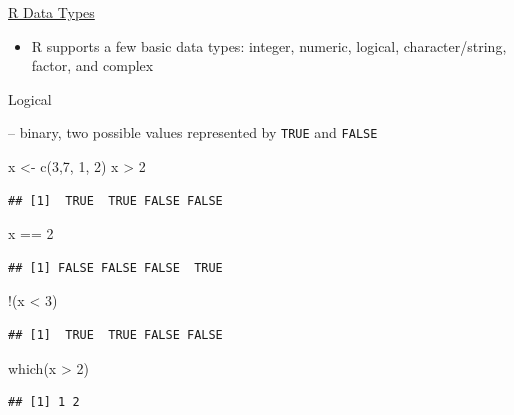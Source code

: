 \documentclass[
  10pt,
  ignorenonframetext,
]{beamer}
\newenvironment{Shaded}{\begin{snugshade}}{\end{snugshade}}
\newcommand{\DecValTok}[1]{\textcolor[rgb]{0.86,0.86,0.80}{#1}}
\newcommand{\KeywordTok}[1]{\textcolor[rgb]{0.94,0.87,0.69}{#1}}
\newcommand{\NormalTok}[1]{\textcolor[rgb]{0.80,0.80,0.80}{#1}}
\newcommand{\OperatorTok}[1]{\textcolor[rgb]{0.94,0.94,0.82}{#1}}
\newcommand{\StringTok}[1]{\textcolor[rgb]{0.80,0.58,0.58}{#1}}
\providecommand{\tightlist}{%
  \setlength{\itemsep}{0pt}\setlength{\parskip}{0pt}}
\begin{document}
\begin{frame}[fragile]{\href{https://www.stat.berkeley.edu/~nolan/stat133/Fall05/lectures/DataTypes4.pdf}{R
Data Types}}
\protect\hypertarget{r-data-types}{}

\begin{itemize}
\tightlist
\item
  R supports a few basic data types: integer, numeric, logical,
  character/string, factor, and complex
\end{itemize}

\begin{block}{Logical}

-- binary, two possible values represented by \texttt{TRUE} and
\texttt{FALSE}

\begin{Shaded}
\begin{Highlighting}[]
\NormalTok{x <-}\StringTok{ }\KeywordTok{c}\NormalTok{(}\DecValTok{3}\NormalTok{,}\DecValTok{7}\NormalTok{, }\DecValTok{1}\NormalTok{, }\DecValTok{2}\NormalTok{)}
\NormalTok{x }\OperatorTok{>}\StringTok{ }\DecValTok{2}
\end{Highlighting}
\end{Shaded}

\begin{verbatim}
## [1]  TRUE  TRUE FALSE FALSE
\end{verbatim}

\begin{Shaded}
\begin{Highlighting}[]
\NormalTok{x }\OperatorTok{==}\StringTok{ }\DecValTok{2}
\end{Highlighting}
\end{Shaded}

\begin{verbatim}
## [1] FALSE FALSE FALSE  TRUE
\end{verbatim}

\begin{Shaded}
\begin{Highlighting}[]
\OperatorTok{!}\NormalTok{(x }\OperatorTok{<}\StringTok{ }\DecValTok{3}\NormalTok{)}
\end{Highlighting}
\end{Shaded}

\begin{verbatim}
## [1]  TRUE  TRUE FALSE FALSE
\end{verbatim}

\begin{Shaded}
\begin{Highlighting}[]
\KeywordTok{which}\NormalTok{(x }\OperatorTok{>}\StringTok{ }\DecValTok{2}\NormalTok{)}
\end{Highlighting}
\end{Shaded}

\begin{verbatim}
## [1] 1 2
\end{verbatim}

\end{block}

\end{frame}
\end{document}
